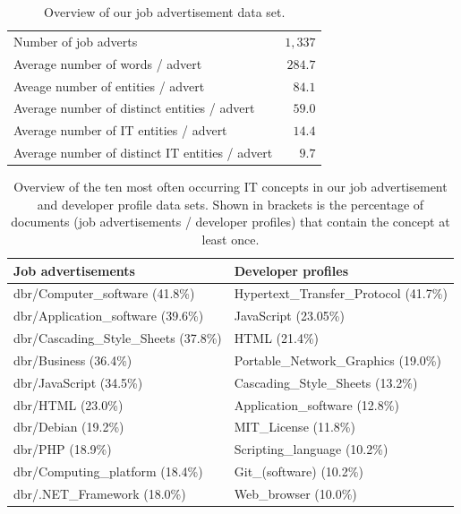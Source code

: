 \documentclass[conference]{IEEEtran}
\begin{document}
\begin{table}
\centering
\begin{tabular}{lr}
\toprule
Number of job adverts								& $1,337$\\
Average number of words / advert 			& $284.7$\\
\midrule
Aveage number of entities / advert			& $84.1$\\
Average number of  distinct entities / advert	& $59.0$\\
\midrule
Average number of IT entities / advert	& $14.4$\\
Average number of distinct IT entities / advert& $9.7$\\

\bottomrule
\end{tabular}
\caption{Overview of our job advertisement data set.}
\label{tab:jobadverts}
\end{table}

\begin{table}
\centering
\footnotesize
\begin{tabular}{ll}
\toprule
\textbf{Job advertisements}	& \textbf{Developer profiles}\\
\midrule
dbr/Computer\_software (41.8\%) 			& Hypertext\_Transfer\_Protocol (41.7\%) \\
dbr/Application\_software (39.6\%)			& JavaScript (23.05\%) \\
dbr/Cascading\_Style\_Sheets (37.8\%)	& HTML (21.4\%) \\
dbr/Business (36.4\%)								& Portable\_Network\_Graphics (19.0\%)\\
dbr/JavaScript (34.5\%)							& Cascading\_Style\_Sheets (13.2\%)\\
dbr/HTML (23.0\%)									& Application\_software (12.8\%) \\
dbr/Debian (19.2\%)								& MIT\_License (11.8\%) \\
dbr/PHP (18.9\%)										& Scripting\_language (10.2\%) \\
dbr/Computing\_platform (18.4\%)		& Git\_(software) (10.2\%) \\
dbr/.NET\_Framework (18.0\%)				& Web\_browser (10.0\%)\\
\bottomrule
\end{tabular}
\caption{Overview of the ten most often occurring IT concepts in our job advertisement and developer profile data sets. Shown in brackets is the percentage of documents (job advertisements / developer profiles) that contain the concept at least once.}
\label{tab:top10}
\end{table}
\end{document}
